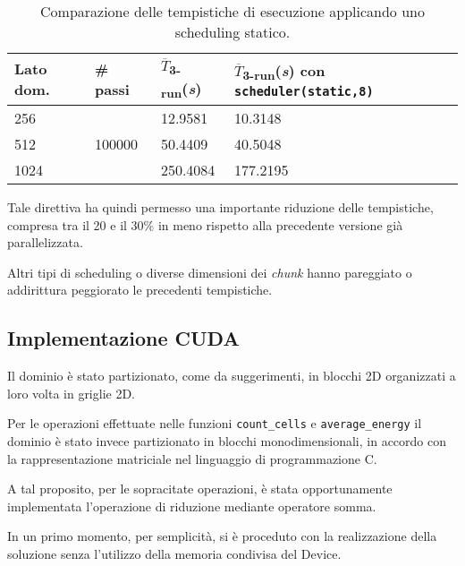 \begin{table}[ht]
\begin{tabularx}{\linewidth}{XXXX}
\toprule
Lato dom. & \# passi & $\overline{T}$\textsubscript{3-run}(\textit{s})&
$\overline{T}$\textsubscript{3-run}(\textit{s}) con \texttt{scheduler(static,8)}\\
\midrule
 256 & \multirow{3}{*}{100000} & 12.9581 & 10.3148 \\
 512 && 50.4409 & 40.5048 \\
 1024 && 250.4084 & 177.2195 \\
\bottomrule
\end{tabularx}
\caption{\label{tab:scheduler}Comparazione delle tempistiche di esecuzione
applicando uno scheduling statico.}
\end{table}

Tale direttiva ha quindi permesso una importante riduzione delle tempistiche,
compresa tra il 20 e il 30\% in meno rispetto alla precedente versione già
parallelizzata.

Altri tipi di scheduling o diverse dimensioni dei \textit{chunk} hanno
pareggiato o addirittura peggiorato le precedenti tempistiche.


\subsection{Implementazione CUDA}

Il dominio è stato partizionato, come da suggerimenti, in blocchi 2D organizzati
a loro volta in griglie 2D.

Per le operazioni effettuate nelle funzioni \texttt{count\_cells} e
\texttt{average\_energy} il dominio è stato invece partizionato in blocchi
monodimensionali, in accordo con la rappresentazione matriciale nel linguaggio
di programmazione C.

A tal proposito, per le sopracitate operazioni, è stata opportunamente
implementata l'operazione di riduzione mediante operatore somma.

In un primo momento, per semplicità, si è proceduto con la realizzazione della
soluzione senza l'utilizzo della memoria condivisa del Device.
